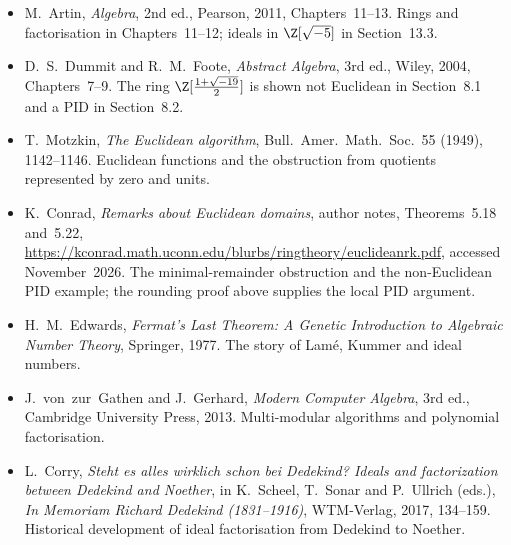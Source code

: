 \begin{itemize}
\item M.~Artin, \emph{Algebra}, 2nd ed., Pearson, 2011, Chapters~11--13. Rings and factorisation in Chapters~11--12; ideals in $\Z[\sqrt{-5}]$ in Section~13.3.
\item D.~S.~Dummit and R.~M.~Foote, \emph{Abstract Algebra}, 3rd ed., Wiley, 2004, Chapters~7--9. The ring $\Z[\frac{1+\sqrt{-19}}2]$ is shown not Euclidean in Section~8.1 and a PID in Section~8.2.
\item T.~Motzkin, \emph{The Euclidean algorithm}, Bull.\ Amer.\ Math.\ Soc.\ 55 (1949), 1142--1146. Euclidean functions and the obstruction from quotients represented by zero and units.
\item K.~Conrad, \emph{Remarks about Euclidean domains}, author notes, Theorems~5.18 and~5.22, \url{https://kconrad.math.uconn.edu/blurbs/ringtheory/euclideanrk.pdf}, accessed November~2026. The minimal-remainder obstruction and the non-Euclidean PID example; the rounding proof above supplies the local PID argument.
\item H.~M.~Edwards, \emph{Fermat's Last Theorem: A Genetic Introduction to Algebraic Number Theory}, Springer, 1977. The story of Lamé, Kummer and ideal numbers.
\item J.~von~zur~Gathen and J.~Gerhard, \emph{Modern Computer Algebra}, 3rd ed., Cambridge University Press, 2013. Multi-modular algorithms and polynomial factorisation.
\item L.~Corry, \emph{Steht es alles wirklich schon bei Dedekind? Ideals and factorization between Dedekind and Noether}, in K.~Scheel, T.~Sonar and P.~Ullrich (eds.), \emph{In Memoriam Richard Dedekind (1831--1916)}, WTM-Verlag, 2017, 134--159. Historical development of ideal factorisation from Dedekind to Noether.
\end{itemize}
